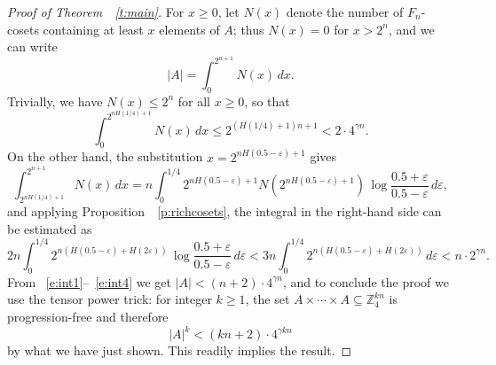 \documentclass[12pt,reqno]{amsart}
\newcommand{\eps}{\varepsilon}
\newcommand{\gam}{\gamma}
\newcommand{\Z}{{\mathbb Z}}
\newcommand{\<}{\langle}
\renewcommand{\>}{\rangle}
\newcommand{\seq}{\subseteq}
\newcommand{\reft}[1]{~\ref{t:#1}}
\newcommand{\refp}[1]{~\ref{p:#1}}
\newcommand{\refe}[1]{~\eqref{e:#1}}
\theoremstyle{remark}
\begin{document}
\begin{proof}[Proof of Theorem~\reft{main}]
For $x\ge 0$, let $N(x)$ denote the number of $F_n$-cosets containing at
least $x$ elements of $A$; thus $N(x)=0$ for $x>2^n$, and we can write
\begin{equation}\label{e:int1}
  |A| = \int_0^{2^{n+1}} N(x)\,dx.
\end{equation}
Trivially, we have $N(x)\le2^n$ for all $x\ge 0$, so that
\begin{equation}\label{e:int2}
  \int_0^{2^{nH(1/4)+1}} N(x)\,dx \le 2^{(H(1/4)+1)n+1} < 2\cdot 4^{\gam n}.
\end{equation}
On the other hand, the substitution $x=2^{nH(0.5-\eps)+1}$ gives
\begin{equation}\label{e:int3}
  \int_{2^{nH(1/4)+1}}^{2^{n+1}} N(x)\,dx
      = n \int_0^{1/4} 2^{nH(0.5-\eps)+1} N(2^{nH(0.5-\eps)+1})
                          \,\log\frac{0.5+\eps}{0.5-\eps} \,d\eps,
\end{equation}
and applying Proposition~\refp{richcosets}, the integral in the right-hand
side can be estimated as
\begin{equation}\label{e:int4}
  2n \int_0^{1/4} 2^{n(H(0.5-\eps)+H(2\eps))}
                       \,\log\frac{0.5+\eps}{0.5-\eps} \,d\eps
            < 3n \int_0^{1/4} 2^{n(H(0.5-\eps)+H(2\eps))} \, d\eps
                                                        < n\cdot 2^{\gam n}.
\end{equation}
From \refe{int1}--\!\!\refe{int4} we get $|A|<(n+2)\cdot4^{\gam n}$, and to
conclude the proof we use the tensor power trick: for integer $k\ge 1$, the
set $A\times\dotsb\times A\seq\Z_4^{kn}$ is progression-free and therefore
  $$ |A|^k < (kn+2)\cdot 4^{\gam kn} $$
by what we have just shown. This readily implies the result.
\end{proof}
\end{document}
